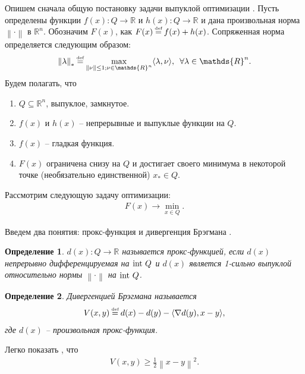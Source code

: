 \documentclass[11pt,a4]{article}
\newcommand{\norm}[1]{\left\lVert#1\right\rVert}
\newtheorem{definition}{Определение}
\newcommand\myeq{\mathrel{\stackrel{\makebox[0pt]{\mbox{\normalfont\tiny def}}}{=}}}
\begin{document}
Опишем сначала общую постановку задачи выпуклой оптимизации \cite{nesterov2010introductory}. 
Пусть определены функции $f(x): Q \longrightarrow \mathds{R}$ и $h(x): Q \longrightarrow \mathds{R}$ и дана произвольная норма $\norm{\cdot}$ в $\mathds{R}^n$. Обозначим $F(x)$, как $F(x) \myeq f(x) + h(x)$. Сопряженная норма определяется следующим образом:
\begin{gather}\norm{\lambda}_* \myeq \max\limits_{\norm{\nu} \leq 1;\nu \in \mathds{R}^n}\langle \lambda,\nu\rangle,\,\,\,\forall \lambda \in \mathds{R}^n.\end{gather}
Будем полагать, что
\begin{enumerate}
	\item $Q \subseteq \mathds{R}^n$, выпуклое, замкнутое.
	\item $f(x)$ и $h(x)$ -- непрерывные и выпуклые функции на $Q$.
	\item $f(x)$ -- гладкая функция.
	\item $F(x)$ ограничена снизу на $Q$ и достигает своего минимума в некоторой точке (необязательно единственной) $x_* \in Q$.
\end{enumerate}

Рассмотрим следующую задачу оптимизации:
\begin{align}
\label{mainTask3}
F(x) \rightarrow \min_{x \in Q}.
\end{align}

Введем два понятия: прокс-функция и дивергенция Брэгмана \cite{gupta2008bregman}.
\begin{definition}
$d(x):Q \rightarrow \mathds{R}$ называется прокс-функцией, если $d(x)$ непрерывно дифференцируемая на $\textnormal{int }Q$ и $d(x)$ является 1-сильно выпуклой относительно нормы $\norm{\cdot}$ на $\textnormal{int }Q$.
\end{definition}
\begin{definition}
Дивергенцией Брэгмана называется 
\begin{align}
V(x,y) \myeq d(x) - d(y) - \langle\nabla d(y), x - y\rangle,
\end{align}
где $d(x)$ -- произвольная прокс-функция.
\end{definition}
Легко показать \cite{ben2001lectures}, что \begin{gather}V(x,y) \geq \frac{1}{2}\norm{x - y}^2.\label{bregmanIneq}\end{gather}
\end{document}
